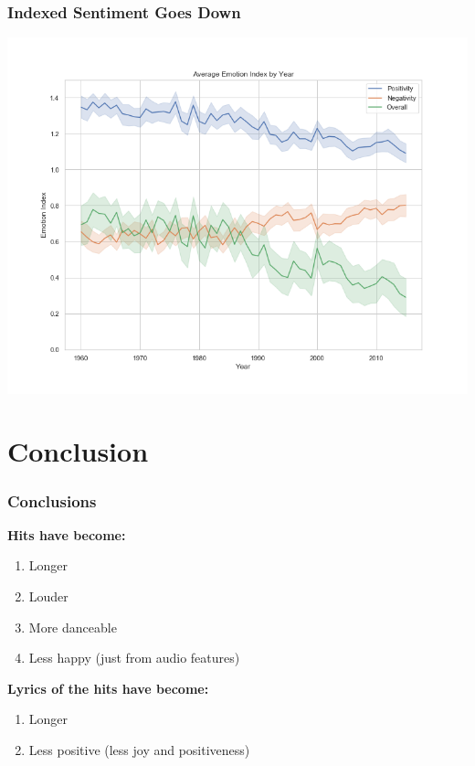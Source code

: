 \documentclass[10pt]{beamer}
\begin{document}
\begin{frame}
\frametitle{Indexed Sentiment Goes Down}

{
    \centering
    \includegraphics[width=\textwidth, height=\textheight,keepaspectratio]{emotion_index_by_year.png}
    \par
}

\end{frame}

\section{Conclusion}

\begin{frame}
\frametitle{Conclusions}

\textbf{Hits have become:}
\medskip
\begin{enumerate}
    \item Longer
    \item Louder
    \item More danceable
    \item Less happy (just from audio features)
\end{enumerate}
\bigskip

\textbf{Lyrics of the hits have become:}
\medskip
\begin{enumerate}
    \item Longer
    \item Less positive (less joy and positiveness)
\end{enumerate}

\end{frame}
\end{document}
